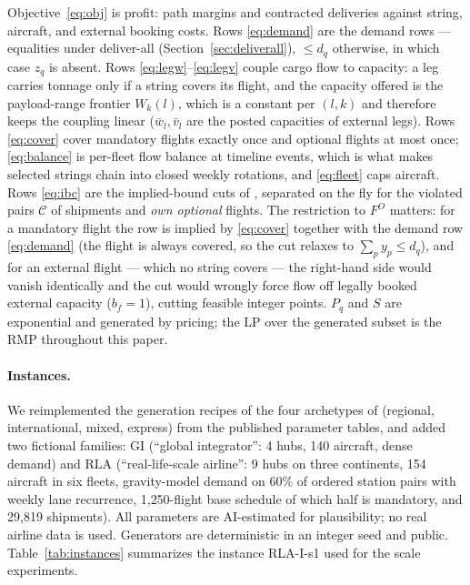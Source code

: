 \documentclass[11pt]{article}
\begin{document}
Objective~\eqref{eq:obj} is profit: path margins and contracted deliveries
against string, aircraft, and external booking costs. Rows
\eqref{eq:demand} are the demand rows --- equalities under deliver-all
(Section~\ref{sec:deliverall}), $\le d_q$ otherwise, in which case $z_q$ is
absent. Rows \eqref{eq:legw}--\eqref{eq:legv} couple cargo flow to capacity:
a leg carries tonnage only if a string covers its flight, and the capacity
offered is the payload-range frontier $W_{k}(l)$, which is a constant per
$(l,k)$ and therefore keeps the coupling linear
($\bar w_l,\bar v_l$ are the posted capacities of external legs). Rows
\eqref{eq:cover} cover mandatory flights exactly once and optional flights at
most once; \eqref{eq:balance} is per-fleet flow balance at timeline events,
which is what makes selected strings chain into closed weekly rotations, and
\eqref{eq:fleet} caps aircraft. Rows \eqref{eq:ibc} are the implied-bound
cuts of \cite{derigs2013}, separated on the fly for the violated pairs
$\mathcal{C}$ of shipments and \emph{own optional} flights. The restriction
to $F^{O}$ matters: for a mandatory flight the row is implied by
\eqref{eq:cover} together with the demand row \eqref{eq:demand} (the
flight is always covered, so the cut relaxes to
$\sum_{p} y_p \le d_q$), and for an external flight --- which no string covers ---
the right-hand side would vanish identically and the cut would wrongly
force flow off legally booked external capacity ($b_f=1$), cutting feasible
integer points. $P_q$ and $S$ are exponential and generated by
pricing; the LP over the generated subset is the RMP throughout this paper.

\paragraph{Instances.} We reimplemented the generation recipes of the four
archetypes of \cite{derigs2013} (regional, international, mixed, express)
from the published parameter tables, and added two fictional families: GI
(``global integrator'': 4 hubs, 140 aircraft, dense demand) and RLA
(``real-life-scale airline'': 9 hubs on three continents, 154 aircraft in
six fleets, gravity-model demand on 60\% of ordered station pairs with
weekly lane recurrence, 1{,}250-flight base schedule of which half is
mandatory, and 29{,}819 shipments). All parameters are AI-estimated for
plausibility; no real airline data is used. Generators are deterministic in
an integer seed and public. Table~\ref{tab:instances} summarizes the
instance RLA-I-s1 used for the scale experiments.
\end{document}
